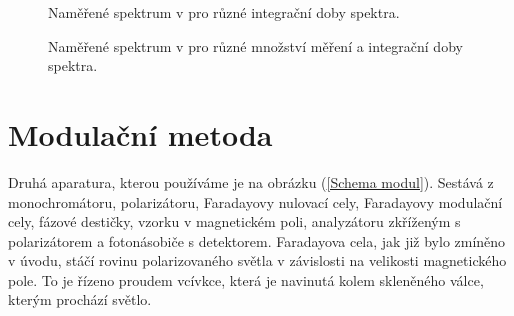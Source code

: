\begin{figure}

\caption{Naměřené spektrum v pro různé integrační doby spektra.}
\label{TPE2}
\end{figure}

\begin{figure}

\caption{Naměřené spektrum v pro různé množství měření a integrační doby spektra.}
\label{TPE3}
\end{figure}


\section{Modulační metoda}
Druhá aparatura, kterou používáme je na obrázku (\ref{Schema modul}). Sestává z monochromátoru, polarizátoru, Faradayovy nulovací cely, Faradayovy modulační cely, fázové destičky, vzorku v magnetickém poli, analyzátoru zkříženým s polarizátorem a fotonásobiče s detektorem. 
Faradayova cela, jak již bylo zmíněno v úvodu, stáčí rovinu polarizovaného světla v závislosti na velikosti magnetického pole. To je řízeno proudem vcívkce, která je navinutá kolem skleněného válce, kterým prochází světlo.

